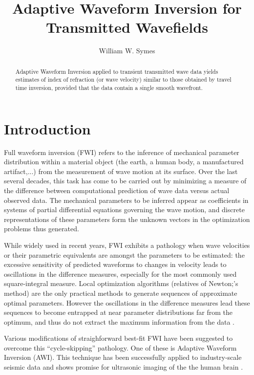 \title{Adaptive Waveform Inversion for Transmitted Wavefields}
\author{William W. Symes}

\begin{abstract}
Adaptive Waveform Inversion
applied to transient transmitted wave data yields estimates of index of
refraction (or wave velocity) similar to those obtained by travel time
inversion, provided that the data contain a single smooth wavefront.
\end{abstract}

\section{Introduction}
Full waveform inversion (FWI) refers to the inference of mechanical
parameter distribution within a material object  (the earth, a human
body, a manufactured artifact,...) from the measurement of wave motion
at its surface. Over the last several decades, this task has come to
be carried out by minimizing a measure of the difference between computational
prediction of wave data versus actual observed
data. The mechanical parameters to be inferred appear as
coefficients in systems of partial differential equations governing
the wave motion, and discrete representations of these parameters form
the unknown vectors in the optimization problems thus generated.

While widely used in recent years, FWI exhibits a pathology when wave
velocities or their parametric equivalents are amongst the parameters
to be estimated: the excessive sensitivity of predicted waveforms to
changes in velocity leads to oscillations in the difference measures,
especially for the most commonly used square-integral measure. Local
optimization algorithms (relatives of Newton;'s method) are the only practical
methods to generate sequences of approximate optimal
parameters. However the oscillations in the difference measures lead
these sequences to become entrapped at near parameter distributions
far from the optimum, and thus do not extract the maximum information
from the data \cite[]{VirieuxOperto:09}. 

Various modifications of straighforward best-fit FWI have been
suggested to overcome this ``cycle-skipping'' pathology. One of these
is Adaptive Waveform Inversion \cite[]{Warner:16} (AWI). This
technique has been successfully applied to industry-scale seismic data
\cite[]{GuaschWarnerRavaut:GEO19,Warneretal:SEG21} and shows promise for
ultrasonic imaging of the the human brain
\cite[]{Guaschetal:NPJDM20}.

